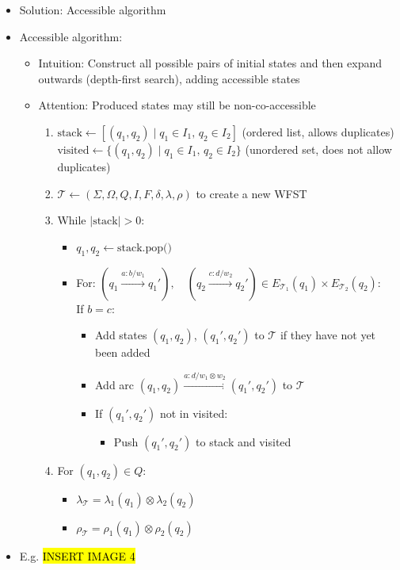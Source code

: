 \begin{itemize}
    \item Solution: Accessible algorithm
    \item Accessible algorithm:
    \begin{itemize}
        \item Intuition: Construct all possible pairs of initial states and then expand outwards (depth-first search), adding accessible states
        \item Attention: Produced states may still be non-co-accessible
        \begin{enumerate}
            \item $\textrm{stack} \gets [(q_1, q_2) \mid q_1 \in I_1, \, q_2 \in I_2]$ (ordered list, allows duplicates)\\
            $\textrm{visited} \gets \{(q_1, q_2) \mid q_1 \in I_1, \, q_2 \in I_2\}$ (unordered set, does not allow duplicates)
            \item $\mathcal{T} \gets (\Sigma, \Omega, Q, I, F, \delta, \lambda, \rho)$ to create a new WFST
            \item While $|\textrm{stack}| > 0$:
            \begin{itemize}
                \item $q_1, q_2 \gets \textrm{stack.pop()}$
                \item For:
                $
                (q_1 \xrightarrow{a:b/w_1} q_1'), \quad (q_2 \xrightarrow{c:d/w_2} q_2') \in E_{\mathcal{T}_1}(q_1) \times E_{\mathcal{T}_2}(q_2)$:\\
                If $b=c$:
                \begin{itemize}
                    \item Add states $(q_1, q_2)$, $(q_1', q_2')$ to $\mathcal{T}$ if they have not yet been added
                    \item Add arc $(q_1, q_2) \xrightarrow{a:d/w_1 \otimes w_2} (q_1', q_2')$ to $\mathcal{T}$
                    \item If $(q_1', q_2')$ not in visited:
                    \begin{itemize}
                        \item Push $(q_1', q_2')$ to stack and visited
                    \end{itemize}
                \end{itemize}
            \end{itemize}
            \item For $(q_1, q_2) \in Q$:
            \begin{itemize}
                \item $
                \lambda_\mathcal{T} = \lambda_1(q_1) \otimes \lambda_2(q_2)
                $
                \item $
                \rho_\mathcal{T} = \rho_1(q_1) \otimes \rho_2(q_2)
                $
            \end{itemize}
        \end{enumerate}
    \end{itemize}
    \item E.g.
    \hl{INSERT IMAGE 4}
\end{itemize}


